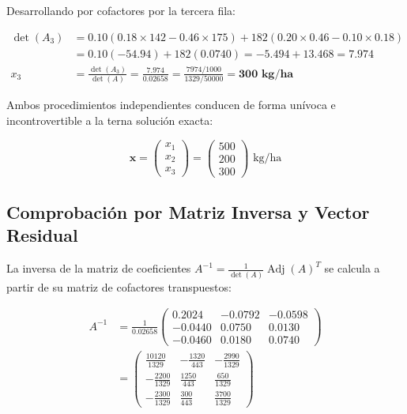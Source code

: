 Desarrollando por cofactores por la tercera fila:

\begin{align}
\det(A_3) &= 0.10(0.18 \times 142 - 0.46 \times 175) + 182(0.20 \times 0.46 - 0.10 \times 0.18) \\
&= 0.10(-54.94) + 182(0.0740) = -5.494 + 13.468 = 7.974 \\[0.15cm]
x_3 &= \frac{\det(A_3)}{\det(A)} = \frac{7.974}{0.02658} = \frac{7974 / 1000}{1329 / 50000} = \mathbf{300\text{ kg/ha}}
\end{align}

Ambos procedimientos independientes conducen de forma unívoca e incontrovertible a la terna solución exacta:

\begin{equation}
\mathbf{x} = \begin{pmatrix} x_1 \\ x_2 \\ x_3 \end{pmatrix} = \begin{pmatrix} 500 \\ 200 \\ 300 \end{pmatrix}\text{ kg/ha}
\end{equation}

\subsection{Comprobación por Matriz Inversa y Vector Residual}

La inversa de la matriz de coeficientes $A^{-1} = \frac{1}{\det(A)} \operatorname{Adj}(A)^T$ se calcula a partir de su matriz de cofactores transpuestos:

\begin{equation}
\begin{aligned}
A^{-1} &= \frac{1}{0.02658}
\begin{pmatrix}
0.2024 & -0.0792 & -0.0598 \\
-0.0440 & 0.0750 & 0.0130 \\
-0.0460 & 0.0180 & 0.0740
\end{pmatrix} \\
&=
\begin{pmatrix}
\frac{10120}{1329} & -\frac{1320}{443} & -\frac{2990}{1329} \\[0.12cm]
-\frac{2200}{1329} & \frac{1250}{443} & \frac{650}{1329} \\[0.12cm]
-\frac{2300}{1329} & \frac{300}{443} & \frac{3700}{1329}
\end{pmatrix}
\end{aligned}
\end{equation}

